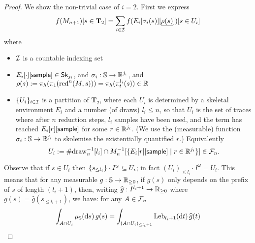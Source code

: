 \begin{proof}
We show the non-trivial case of $i = 2$.
First we express 
\begin{equation}
f(M_{n+1})[s \in \mathbf{T}_2] = \sum_{i \in \calI} 
f(E_i[\sigma_i(s)][\underline{\rho(s)}])[s \in U_i]
\label{eqn:f 2 n+1}
\end{equation}
where 
\begin{itemize}
\item $\mathcal{I}$ is a countable indexing set
\item $E_i[\cdot][\mathsf{sample}] \in \mathsf{Sk}_{j_i}$, and $\sigma_i : {\mathbb{S}} \to \mathbb{R}^{j_i}$, and $\rho(s) := \pi_h(\pi_1(\operatorname{red}^n(M, s))) = \pi_h(\pi_t^{l_i}(s)) \in \mathbb{R}$ 
\item $\{{U_i}\}_{i \in \mathcal{I}}$ is a partition of $\mathbf{T}_2$, 
where each $U_i$ is determined by a skeletal environment $E_i$ and a number (of draws) $l_i \leq n$, so that $U_i$ is the set of traces where after $n$ reduction steps, $l_i$ samples have been used, and the term has reached $E_i[r][\mathsf{sample}]$ for some $r \in \mathbb{R}^{j_i}$.
(We use the (measurable) function $\sigma_i : {\mathbb{S}} \to \mathbb{R}^{j_i}$ to skolemise the existentially quantified $r$.)
Equivalently
\[
U_i := \#\mathrm{draw}_n^{-1}[l_i] \cap M_n^{-1}[\{E_i[r][\mathsf{sample}] \mid r \in \mathbb{R}^{j_i}\}] \in \mathcal{F}_n.
\]
\end{itemize}

Observe that if $s \in U_i$ then $\{{s_{\leq l_i}}\} \cdot I^\omega \subseteq U_i$;
in fact $(U_i)_{\leq l_i} \cdot I^\omega = U_i$.
This means that for any measurable $g : {\mathbb{S}} \to \mathbb{R}_{\geq 0}$, if $g(s)$ only depends on the prefix of $s$ of length $(l_i+1)$, then, writing $\widehat{g} : I^{l_i+1} \to \mathbb{R}_{\geq 0}$ where $g(s) = \widehat{g}(s_{\leq l_i+1})$, we have: for any $A \in \mathcal{F}_n$ 
\begin{equation}
\int_{A \cap U_i}  \mu_{\entrosp}(\dif s) \, g(s) = 
\int_{(A \cap U_i)_{\leq l_i+1}} \Leb_{l_i+1}(\dif t) \, \widehat{g}(t)
\label{eqn:truncate}
\end{equation}


\end{proof}
